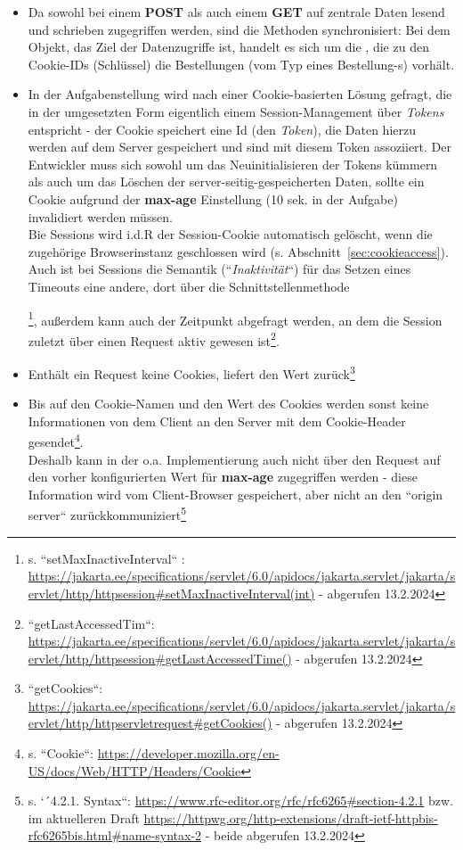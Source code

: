 \begin{itemize}
    \item Da sowohl bei einem \textbf{POST} als auch einem \textbf{GET} auf zentrale Daten lesend und schrieben zugegriffen werden, sind die Methoden synchronisiert: Bei dem Objekt, das Ziel der Datenzugriffe ist, handelt es sich um die , die zu den Cookie-IDs (Schlüssel) die Bestellungen (vom Typ eines Bestellung-s) vorhält.
    \item In der Aufgabenstellung wird nach einer Cookie-basierten Lösung gefragt, die in der umgesetzten Form eigentlich einem Session-Management über \textit{Tokens} entspricht -
     der Cookie speichert eine Id (den \textit{Token}), die Daten hierzu werden auf dem Server gespeichert und sind mit diesem Token assoziiert.
    Der Entwickler muss sich sowohl um das Neuinitialisieren der Tokens kümmern als auch um das Löschen der server-seitig-gespeicherten Daten, sollte ein Cookie aufgrund der \textbf{max-age} Einstellung (10 sek. in der Aufgabe) invalidiert werden müssen.\\
    Bie Sessions wird i.d.R der Session-Cookie automatisch gelöscht, wenn die zugehörige Browserinstanz geschlossen wird (s. Abschnitt~\ref{sec:cookieaccess}).\\
    Auch ist bei Sessions die Semantik (``\textit{Inaktivität}``) für das Setzen eines Timeouts eine andere, dort über die Schnittstellenmethode \begin{center}\end{center}\footnote{
        s. ``setMaxInactiveInterval`` : \url{https://jakarta.ee/specifications/servlet/6.0/apidocs/jakarta.servlet/jakarta/servlet/http/httpsession#setMaxInactiveInterval(int)} - abgerufen 13.2.2024
    }, außerdem kann auch der Zeitpunkt abgefragt werden, an dem die Session zuletzt über einen Request aktiv gewesen ist\footnote{``getLastAccessedTim``: \url{https://jakarta.ee/specifications/servlet/6.0/apidocs/jakarta.servlet/jakarta/servlet/http/httpsession#getLastAccessedTime()} - abgerufen 13.2.2024}.
    \item Enthält ein Request keine Cookies, liefert  den Wert  zurück\footnote{
    ``getCookies``: \url{https://jakarta.ee/specifications/servlet/6.0/apidocs/jakarta.servlet/jakarta/servlet/http/httpservletrequest#getCookies()} - abgerufen 13.2.2024
    }
    \item Bis auf den Cookie-Namen und den Wert des Cookies werden sonst keine Informationen von dem Client an den Server mit dem Cookie-Header gesendet\footnote{
    s. ``Cookie``: \url{https://developer.mozilla.org/en-US/docs/Web/HTTP/Headers/Cookie}
    }.\\
    Deshalb kann in der o.a. Implementierung auch nicht über den Request auf den vorher konfigurierten Wert für \textbf{max-age} zugegriffen werden - diese Information wird vom Client-Browser gespeichert, aber nicht an den ``origin server`` zurückkommuniziert\footnote{
    s. `´4.2.1.  Syntax``: \url{https://www.rfc-editor.org/rfc/rfc6265#section-4.2.1} bzw. im aktuelleren Draft \url{https://httpwg.org/http-extensions/draft-ietf-httpbis-rfc6265bis.html#name-syntax-2} - beide abgerufen 13.2.2024
    }
\end{itemize}